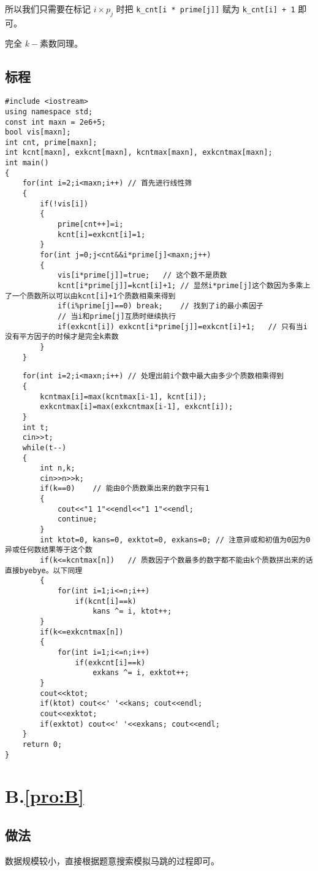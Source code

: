 \documentclass[
	lang=cn,
	color=blue
]{elegantbook}
\newcommand{\solutionheader}[1]{
	\chapter*{#1.\quad \ref*{pro:#1}}
	\addcontentsline{toc}{chapter}{A.\ref*{pro:#1}}
}
\begin{document}
所以我们只需要在标记 $i\times p_j$ 时把 \verb|k_cnt[i * prime[j]]| 赋为 \verb|k_cnt[i] + 1| 即可。

完全 $k-$素数同理。

\section*{标程}
\begin{lstlisting}
#include <iostream>
using namespace std;
const int maxn = 2e6+5;
bool vis[maxn];
int cnt, prime[maxn];
int kcnt[maxn], exkcnt[maxn], kcntmax[maxn], exkcntmax[maxn];
int main()
{
    for(int i=2;i<maxn;i++) // 首先进行线性筛
    {
        if(!vis[i])
        {
            prime[cnt++]=i;
            kcnt[i]=exkcnt[i]=1;
        }
        for(int j=0;j<cnt&&i*prime[j]<maxn;j++)
        {
            vis[i*prime[j]]=true;   // 这个数不是质数
            kcnt[i*prime[j]]=kcnt[i]+1; // 显然i*prime[j]这个数因为多乘上了一个质数所以可以由kcnt[i]+1个质数相乘来得到
            if(i%prime[j]==0) break;    // 找到了i的最小素因子
            // 当i和prime[j]互质时继续执行
            if(exkcnt[i]) exkcnt[i*prime[j]]=exkcnt[i]+1;   // 只有当i没有平方因子的时候才是完全k素数
        }
    }
\end{lstlisting}
\newpage

\begin{lstlisting}
    for(int i=2;i<maxn;i++) // 处理出前i个数中最大由多少个质数相乘得到
    {
        kcntmax[i]=max(kcntmax[i-1], kcnt[i]);
        exkcntmax[i]=max(exkcntmax[i-1], exkcnt[i]);
    }
    int t;
    cin>>t;
    while(t--)
    {
        int n,k;
        cin>>n>>k;
        if(k==0)    // 能由0个质数乘出来的数字只有1
        {
            cout<<"1 1"<<endl<<"1 1"<<endl;
            continue;
        }
        int ktot=0, kans=0, exktot=0, exkans=0; // 注意异或和初值为0因为0异或任何数结果等于这个数
        if(k<=kcntmax[n])   // 质数因子个数最多的数字都不能由k个质数拼出来的话直接byebye。以下同理
        {
            for(int i=1;i<=n;i++)
                if(kcnt[i]==k)
                    kans ^= i, ktot++;
        }
        if(k<=exkcntmax[n])
        {
            for(int i=1;i<=n;i++)
                if(exkcnt[i]==k)
                    exkans ^= i, exktot++;
        }
        cout<<ktot;
        if(ktot) cout<<' '<<kans; cout<<endl;
        cout<<exktot;
        if(exktot) cout<<' '<<exkans; cout<<endl;
    }
    return 0;
}
\end{lstlisting}

\solutionheader{B}
\section*{做法}
数据规模较小，直接根据题意搜索模拟马跳的过程即可。
\end{document}
